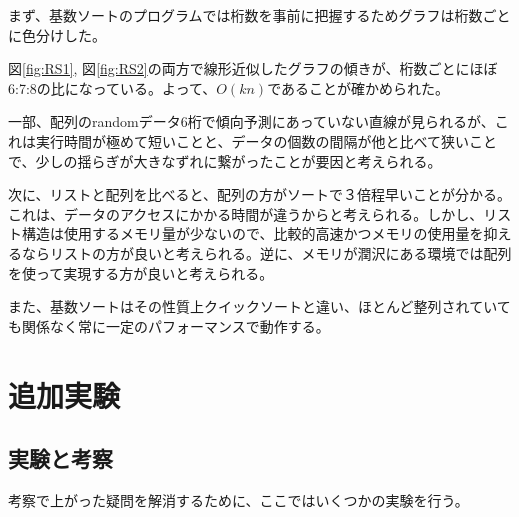 \documentclass[a4j,dvipdfmx]{jsreport}
\begin{document}
まず、基数ソートのプログラムでは桁数を事前に把握するためグラフは桁数ごとに色分けした。\par
図\ref{fig:RS1}, 図\ref{fig:RS2}の両方で線形近似したグラフの傾きが、桁数ごとにほぼ6:7:8の比になっている。よって、$O(kn)$であることが確かめられた。\par
一部、配列のrandomデータ6桁で傾向予測にあっていない直線が見られるが、これは実行時間が極めて短いことと、データの個数の間隔が他と比べて狭いことで、少しの揺らぎが大きなずれに繋がったことが要因と考えられる。\par
次に、リストと配列を比べると、配列の方がソートで３倍程早いことが分かる。これは、データのアクセスにかかる時間が違うからと考えられる。しかし、リスト構造は使用するメモリ量が少ないので、比較的高速かつメモリの使用量を抑えるならリストの方が良いと考えられる。逆に、メモリが潤沢にある環境では配列を使って実現する方が良いと考えられる。\par
また、基数ソートはその性質上クイックソートと違い、ほとんど整列されていても関係なく常に一定のパフォーマンスで動作する。

\chapter{追加実験}
\section{実験と考察}
考察で上がった疑問を解消するために、ここではいくつかの実験を行う。
\end{document}
